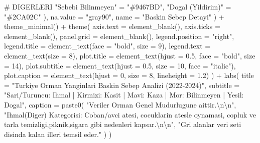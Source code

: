 \documentclass[
  11pt,
  a4paper,
  DIV=11,
  numbers=noendperiod]{scrartcl}
\newenvironment{Shaded}{\begin{snugshade}}{\end{snugshade}}
\newcommand{\AttributeTok}[1]{\textcolor[rgb]{0.40,0.45,0.13}{#1}}
\newcommand{\CommentTok}[1]{\textcolor[rgb]{0.37,0.37,0.37}{#1}}
\newcommand{\DecValTok}[1]{\textcolor[rgb]{0.68,0.00,0.00}{#1}}
\newcommand{\FloatTok}[1]{\textcolor[rgb]{0.68,0.00,0.00}{#1}}
\newcommand{\FunctionTok}[1]{\textcolor[rgb]{0.28,0.35,0.67}{#1}}
\newcommand{\NormalTok}[1]{\textcolor[rgb]{0.00,0.23,0.31}{#1}}
\newcommand{\OtherTok}[1]{\textcolor[rgb]{0.00,0.23,0.31}{#1}}
\newcommand{\SpecialCharTok}[1]{\textcolor[rgb]{0.37,0.37,0.37}{#1}}
\newcommand{\StringTok}[1]{\textcolor[rgb]{0.13,0.47,0.30}{#1}}
\begin{document}
\begin{Shaded}
\begin{Highlighting}[]
      \CommentTok{\# DIGERLERI}
      \StringTok{"Sebebi Bilinmeyen"} \OtherTok{=} \StringTok{"\#9467BD"}\NormalTok{,}
      \StringTok{"Dogal (Yildirim)"} \OtherTok{=} \StringTok{"\#2CA02C"}
\NormalTok{    ), }
    \AttributeTok{na.value =} \StringTok{"gray90"}\NormalTok{, }
    \AttributeTok{name =} \StringTok{"Baskin Sebep Detayi"}
\NormalTok{  ) }\SpecialCharTok{+}
  \FunctionTok{theme\_minimal}\NormalTok{() }\SpecialCharTok{+}
  \FunctionTok{theme}\NormalTok{(}
    \AttributeTok{axis.text =} \FunctionTok{element\_blank}\NormalTok{(),}
    \AttributeTok{axis.ticks =} \FunctionTok{element\_blank}\NormalTok{(),}
    \AttributeTok{panel.grid =} \FunctionTok{element\_blank}\NormalTok{(),}
    \AttributeTok{legend.position =} \StringTok{"right"}\NormalTok{,}
    \AttributeTok{legend.title =} \FunctionTok{element\_text}\NormalTok{(}\AttributeTok{face =} \StringTok{"bold"}\NormalTok{, }\AttributeTok{size =} \DecValTok{9}\NormalTok{),}
    \AttributeTok{legend.text =} \FunctionTok{element\_text}\NormalTok{(}\AttributeTok{size =} \DecValTok{8}\NormalTok{),}
    \AttributeTok{plot.title =} \FunctionTok{element\_text}\NormalTok{(}\AttributeTok{hjust =} \FloatTok{0.5}\NormalTok{, }\AttributeTok{face =} \StringTok{"bold"}\NormalTok{, }\AttributeTok{size =} \DecValTok{14}\NormalTok{),}
    \AttributeTok{plot.subtitle =} \FunctionTok{element\_text}\NormalTok{(}\AttributeTok{hjust =} \FloatTok{0.5}\NormalTok{, }\AttributeTok{size =} \DecValTok{10}\NormalTok{, }\AttributeTok{face =} \StringTok{"italic"}\NormalTok{),}
    \AttributeTok{plot.caption =} \FunctionTok{element\_text}\NormalTok{(}\AttributeTok{hjust =} \DecValTok{0}\NormalTok{, }\AttributeTok{size =} \DecValTok{8}\NormalTok{, }\AttributeTok{lineheight =} \FloatTok{1.2}\NormalTok{)}
\NormalTok{  ) }\SpecialCharTok{+}
  \FunctionTok{labs}\NormalTok{(}
    \AttributeTok{title =} \StringTok{"Turkiye Orman Yanginlari Baskin Sebep Analizi (2022{-}2024)"}\NormalTok{,}
    \AttributeTok{subtitle =} \StringTok{"Sari/Turuncu: Ihmal | Kirmizi: Kasit | Mavi: Kaza | Mor: Bilinmeyen | Yesil: Dogal"}\NormalTok{,}
    \AttributeTok{caption =} \FunctionTok{paste0}\NormalTok{(}
      \StringTok{"Veriler Orman Genel Mudurlugune aittir.}\SpecialCharTok{\textbackslash{}n\textbackslash{}n}\StringTok{"}\NormalTok{,}
      \StringTok{"Ihmal(Diger) Kategorisi: Coban/avci atesi, cocuklarin atesle oynamasi, copluk ve tarla temizligi,piknik,sigara gibi nedenleri kapsar.}\SpecialCharTok{\textbackslash{}n\textbackslash{}n}\StringTok{"}\NormalTok{,}
      \StringTok{"Gri alanlar veri seti disinda kalan illeri temsil eder."}
\NormalTok{    )}
\NormalTok{  )}
\end{Highlighting}
\end{Shaded}
\end{document}
